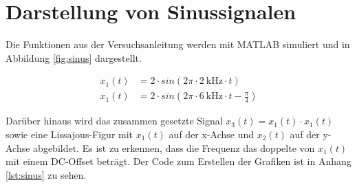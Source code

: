 \documentclass[
    paper=a4,
    fontsize=10pt,
    DIV=13,
    oneside,
]{scrartcl}
\date{\today}
\begin{document}
\maketitle




\section{Darstellung von Sinussignalen}
    Die Funktionen aus der Versuchsanleitung \cite{versuch1} werden mit MATLAB simuliert und in Abbildung \ref{fig:sinus} dargestellt.

    \begin{align}
        x_1(t) &= 2 \cdot sin(2\pi \cdot \SI{2}{\kilo\hertz} \cdot t)\\
        x_1(t) &= 2 \cdot sin(2\pi \cdot \SI{6}{\kilo\hertz} \cdot t - \frac{\pi}{4})
    \end{align}

    Darüber hinaus wird das zusammen gesetzte Signal \(x_3(t)=x_1(t) \cdot x_1(t)\) sowie eine Lissajous-Figur mit \(x_1(t)\) auf der x-Achse und \(x_2(t)\) auf der y-Achse abgebildet. Es ist zu erkennen, dass die Frequenz das doppelte von \(x_1(t)\) mit einem DC-Offset beträgt. Der Code zum Erstellen der Grafiken ist in Anhang \ref{lst:sinus} zu sehen.
\end{document}
